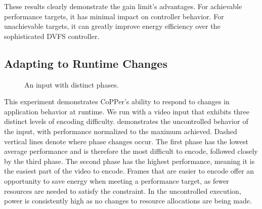 
These results clearly demonstrate the gain limit's advantages.
For achievable performance targets, it has minimal impact on controller behavior.
For unachievable targets, it can greatly improve energy efficiency over the sophisticated DVFS controller.


\subsection{Adapting to Runtime Changes}
\label{sec:copper-eval-runtime}

\begin{figure}[t]
  \centering
  \newline
  \caption{An  input with distinct phases.}
  \label{fig:copper-phases}
\end{figure}

This experiment demonstrates CoPPer's ability to respond to changes in application behavior at runtime.
We run  with a video input that exhibits three distinct levels of encoding difficulty.
 demonstrates the uncontrolled behavior of the input, with performance normalized to the maximum achieved.
Dashed vertical lines denote where phase changes occur.
The first phase has the lowest average performance and is therefore the most difficult to encode, followed closely by the third phase.
The second phase has the highest performance, meaning it is the easiest part of the video to encode.
Frames that are easier to encode offer an opportunity to save energy when meeting a performance target, as fewer resources are needed to satisfy the constraint.
In the uncontrolled execution, power is consistently high as no changes to resource allocations are being made.

